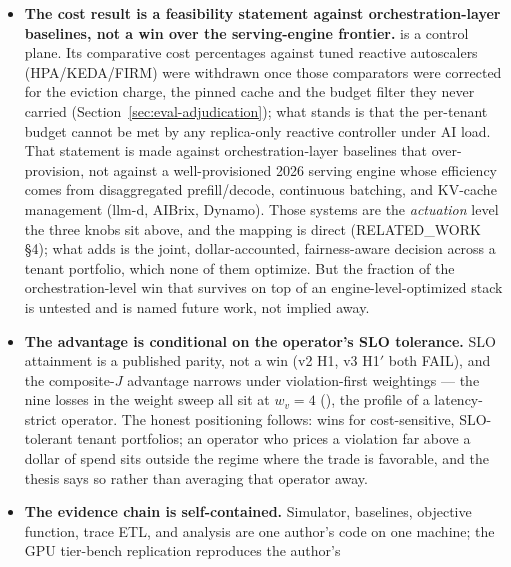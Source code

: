 \begin{itemize}
        hit-rate benefit (noise, bucketing, differential privacy) is an open
        frontier question the partition/padding/TTL sweep does not answer.
  \item \textbf{The cost result is a feasibility statement against
        orchestration-layer baselines, not a win over the serving-engine
        frontier.} \polyforge{} is a control plane. Its comparative cost
        percentages against tuned reactive autoscalers (HPA/KEDA/FIRM) were
        withdrawn once those comparators were corrected for the eviction
        charge, the pinned cache and the budget filter they never carried
        (Section~\ref{sec:eval-adjudication}); what stands is that the
        per-tenant budget cannot be met by any replica-only reactive
        controller under AI load. That statement is made against
        orchestration-layer baselines that over-provision, not against a
        well-provisioned 2026 serving engine whose efficiency comes from
        disaggregated prefill/decode, continuous batching, and KV-cache
        management (llm-d, AIBrix, Dynamo). Those systems are the \emph{actuation} level
        the three knobs sit above, and the mapping is direct
        (RELATED\_WORK \S4); what \polyforge{} adds is the joint,
        dollar-accounted, fairness-aware decision across a tenant portfolio,
        which none of them optimize. But the fraction of the orchestration-level
        win that survives on top of an engine-level-optimized stack is
        untested and is named future work, not implied away.
  \item \textbf{The advantage is conditional on the operator's SLO
        tolerance.} SLO attainment is a published parity, not a win
        (v2 H1, v3 H1$'$ both FAIL), and the composite-$J$ advantage narrows
        under violation-first weightings --- the nine losses in the weight
        sweep all sit at $w_v{=}4$
        (), the profile of a
        latency-strict operator. The honest positioning follows: \polyforge{}
        wins for cost-sensitive, SLO-tolerant tenant portfolios; an operator
        who prices a violation far above a dollar of spend sits outside the
        regime where the trade is favorable, and the thesis says so rather
        than averaging that operator away.
  \item \textbf{The evidence chain is self-contained.} Simulator, baselines,
        objective function, trace ETL, and analysis are one author's code on
        one machine; the GPU tier-bench replication reproduces the author's

\end{itemize}

